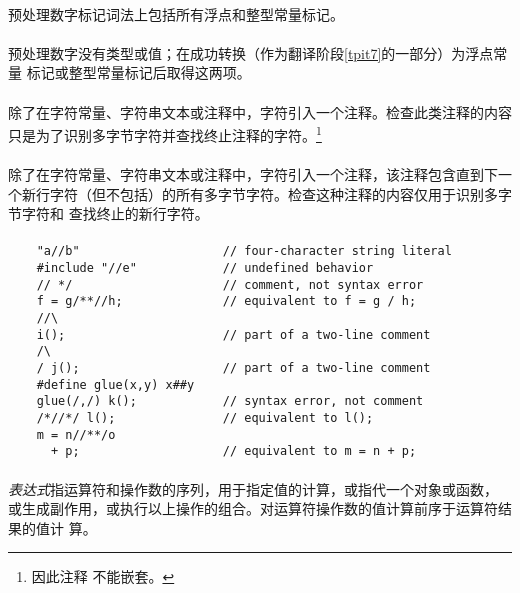 {\paragraph{}
预处理数字标记词法上包括所有浮点和整型常量标记。

\semantic
\paragraph{}
预处理数字没有类型或值；在成功转换（作为翻译阶段\ref{tpit7}的一部分）为浮点常量
标记或整型常量标记后取得这两项。

\paragraph{}
除了在字符常量、字符串文本或注释中，字符\tm{/*}引入一个注释。检查此类注释的内容
只是为了识别多字节字符并查找终止注释的字符\tm{*/}。\footnote{因此注释
不能嵌套。}

\paragraph{}
除了在字符常量、字符串文本或注释中，字符\tm{//}引入一个注释，该注释包含直到下一
个新行字符（但不包括）的所有多字节字符。检查这种注释的内容仅用于识别多字节字符和
查找终止的新行字符。

\paragraph{}
\ex*
\begin{lstlisting}
    "a//b"                    // four-character string literal
    #include "//e"            // undefined behavior
    // */                     // comment, not syntax error
    f = g/**//h;              // equivalent to f = g / h;
    //\
    i();                      // part of a two-line comment
    /\
    / j();                    // part of a two-line comment
    #define glue(x,y) x##y
    glue(/,/) k();            // syntax error, not comment
    /*//*/ l();               // equivalent to l();
    m = n//**/o
      + p;                    // equivalent to m = n + p;
\end{lstlisting}

\paragraph{}
\textit{表达式}指运算符和操作数的序列，用于指定值的计算，或指代一个对象或函数，
或生成副作用，或执行以上操作的组合。对运算符操作数的值计算前序于运算符结果的值计
算。

}
